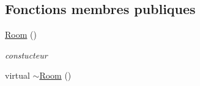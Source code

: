 \subsection*{Fonctions membres publiques}
\begin{DoxyCompactItemize}
\item 
\hypertarget{class_room_ac6ef93a7d9c3e1d624e025058d5f16ff}{\hyperlink{class_room_ac6ef93a7d9c3e1d624e025058d5f16ff}{Room} ()}\label{class_room_ac6ef93a7d9c3e1d624e025058d5f16ff}

\begin{DoxyCompactList}\small\item\em constucteur \end{DoxyCompactList}\item 
\hypertarget{class_room_a67d5da09983cc53097807fd43ba5481a}{virtual \hyperlink{class_room_a67d5da09983cc53097807fd43ba5481a}{$\sim$\-Room} ()}\label{class_room_a67d5da09983cc53097807fd43ba5481a}


\end{DoxyCompactItemize}

